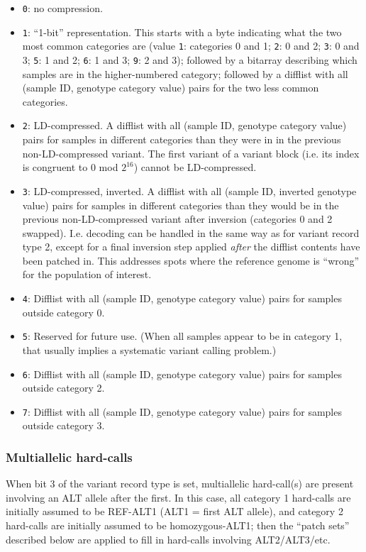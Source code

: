 \documentclass[8pt]{article}
\begin{document}
\begin{itemize}
\item \texttt{0}: no compression.
\item \texttt{1}: ``1-bit'' representation.  This starts with a byte indicating
  what the two most common categories are (value \texttt{1}: categories 0 and
  1; \texttt{2}: 0 and 2; \texttt{3}: 0 and 3; \texttt{5}: 1 and 2; \texttt{6}:
  1 and 3; \texttt{9}: 2 and 3); followed by a bitarray describing which
  samples are in the higher-numbered category; followed by a difflist with all
  (sample ID, genotype category value) pairs for the two less common
  categories.
\item \texttt{2}: LD-compressed.  A difflist with all (sample ID, genotype
  category value) pairs for samples in different categories than they were in
  in the previous non-LD-compressed variant.  The first variant of a variant
  block (i.e. its index is congruent to 0 mod $2^{16}$) cannot be
  LD-compressed.
\item \texttt{3}: LD-compressed, inverted.  A difflist with all (sample ID,
  inverted genotype value) pairs for samples in different categories than they
  would be in the previous non-LD-compressed variant after inversion
  (categories 0 and 2 swapped).  I.e. decoding can be handled in the same way
  as for variant record type 2, except for a final inversion step applied
  \textit{after} the difflist contents have been patched in.  This addresses
  spots where the reference genome is ``wrong'' for the population of interest.
\item \texttt{4}: Difflist with all (sample ID, genotype category value) pairs
  for samples outside category 0.
\item \texttt{5}: Reserved for future use.  (When all samples appear to be in
  category 1, that usually implies a systematic variant calling problem.)
\item \texttt{6}: Difflist with all (sample ID, genotype category value) pairs
  for samples outside category 2.
\item \texttt{7}: Difflist with all (sample ID, genotype category value) pairs
  for samples outside category 3.
\end{itemize}

\subsubsection{Multiallelic hard-calls}

When bit 3 of the variant record type is set, multiallelic hard-call(s) are
present involving an ALT allele after the first.  In this case, all category 1
hard-calls are initially assumed to be REF-ALT1 (ALT1 = first ALT allele), and
category 2 hard-calls are initially assumed to be homozygous-ALT1; then the
``patch sets'' described below are applied to fill in hard-calls involving
ALT2/ALT3/etc.
\end{document}
